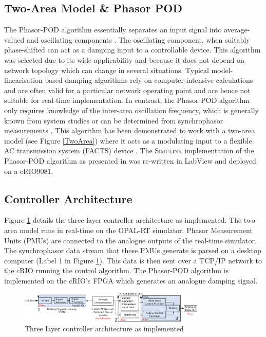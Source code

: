 \documentclass[conference]{IEEEtran}
\begin{document}
\subsection{Two-Area Model \& Phasor POD}
The Phasor-POD algorithm essentially separates an input signal into average-valued and oscillating components \cite{PhasorPOD}. The oscillating component, when suitably phase-shifted can act as a damping input to a controllable device. This algorithm\cite{PhasorPOD} was selected due to its wide applicability and because it does not depend on network topology which can change in several situations. Typical model-linearisation based damping algorithms rely on computer-intensive calculations and are often valid for a particular network operating point and are hence not suitable for real-time implementation. In contrast, the Phasor-POD algorithm only requires knowledge of the inter-area oscillation frequency, which is generally known from system studies or can be determined from synchrophasor measurements \cite{TaskForce}. This algorithm has been demonstrated to work with a two-area model (see Figure \ref{TwoArea}) where it acts as a modulating input to a flexible AC transmission system (FACTS) device \cite{PhasorPODImplement}. The \textsc{Simulink} implementation of the Phasor-POD algorithm as presented in \cite{PhasorPODImplement} was re-written in LabView and deployed on a cRIO9081.

\subsection{Controller Architecture}
Figure \ref{FinalArch} details the three-layer controller architecture as implemented. The two-area model runs in real-time on the OPAL-RT simulator. Phasor Measurement Units (PMUs) are connected to the analogue outputs of the real-time simulator. The synchrophasor data stream that these PMUs generate is parsed on a desktop computer (Label 1 in Figure \ref{FinalArch}). This data is then sent over a TCP/IP network to the cRIO running the control algorithm. The Phasor-POD algorithm is implemented on the cRIO's FPGA which generates an analogue damping signal.

\begin{figure}[]
\centering
\includegraphics[width=3.5in]{ArchitectureDevelopment.pdf} 
\caption{Three layer controller architecture as implemented}
\label{FinalArch}
\end{figure}
\end{document}
